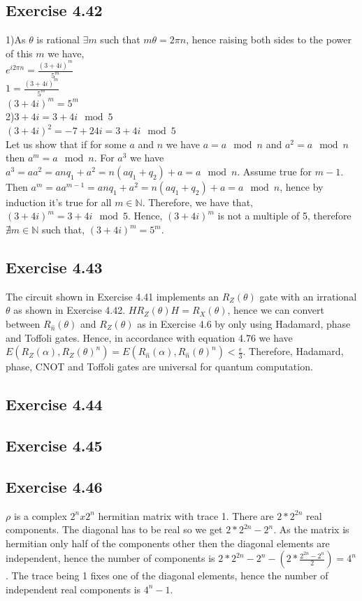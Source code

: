 \documentclass[a4paper,12pt]{article}
\begin{document}
\subsection*{Exercise 4.42}
1)As $\theta$ is rational $\exists m$ such that $m\theta=2\pi n$, hence raising both sides
to the power of this $m$ we have,\\
$e^{i2\pi n}=\frac{(3+4i)^m}{5^m}$\\
$1=\frac{(3+4i)^m}{5^m}$\\
$(3+4i)^m=5^m$\\
2)$3+4i=3+4i \mod{5}$\\
$(3+4i)^2=-7+24i=3+4i \mod{5}$\\
Let us show that if for some $a$ and $n$ we have $a=a\mod{n}$ and $a^2=a\mod{n}$ then
$a^m=a\mod{n}$. For $a^3$ we have $a^3=aa^2=anq_1+a^2=n(aq_1+q_2)+a=a\mod{n}$. Assume
true for $m-1$. Then $a^m=aa^{m-1}=anq_1+a^2=n(aq_1+q_2)+a=a\mod{n}$, hence by induction
it's true for all $m\in \mathbb{N}$. Therefore, we have that, $(3+4i)^m=3+4i\mod{5}$.
Hence, $(3+4i)^m$ is not a multiple of 5, therefore $\nexists m\in\mathbb{N}$ such that,
$(3+4i)^m=5^m$.
\subsection*{Exercise 4.43}
The circuit shown in Exercise 4.41 implements an $R_Z(\theta)$ gate with an 
irrational $\theta$ as shown in Exercise 4.42. $HR_Z(\theta)H=R_X(\theta)$, hence
we can convert between $R_{\hat{n}}(\theta)$ and $R_Z(\theta)$ as in Exercise 4.6 by only using
Hadamard, phase and Toffoli gates. Hence, in accordance with equation 4.76 we have
$E(R_Z(\alpha),R_Z(\theta)^n)=E(R_{\hat{n}}(\alpha),R_{\hat{n}}(\theta)^n)<\frac{\epsilon}{3}$.
Therefore, Hadamard, phase, CNOT and Toffoli gates are universal for quantum
computation.
\subsection*{Exercise 4.44}
\subsection*{Exercise 4.45}
\subsection*{Exercise 4.46}
$\rho$ is a complex $2^nx2^n$ hermitian matrix with trace 1. There are
$2*2^{2n}$ real components. The diagonal has to be real so we get 
$2*2^{2n}-2^n$. As the matrix is hermitian only half of the components
other then the diagonal elements are independent, hence the number of components
is $2*2^{2n}-2^n-(2*\frac{2^{2n}-2^n}{2})=4^n$. The trace being 1 fixes one 
of the diagonal elements, hence the number of independent real components is
$4^n-1$.
\end{document}
